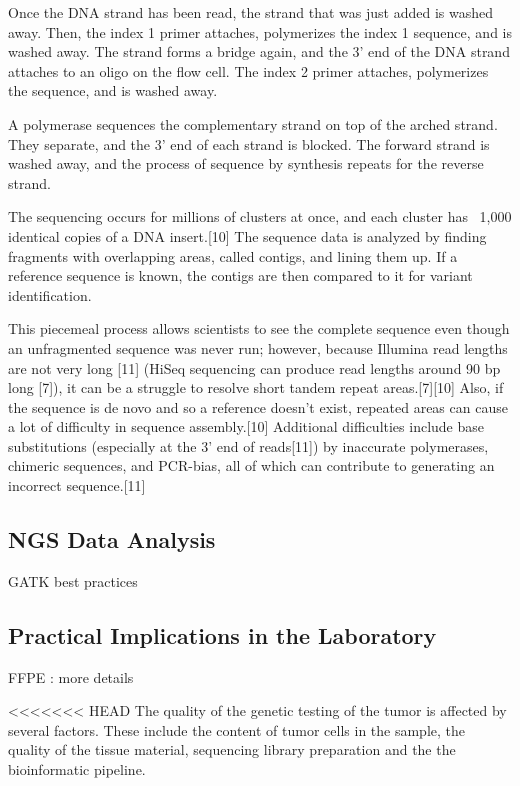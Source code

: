 Once the DNA strand has been read, the strand that was just added is washed away. Then, the index 1 primer attaches, polymerizes the index 1 sequence, and is washed away. The strand forms a bridge again, and the 3’ end of the DNA strand attaches to an oligo on the flow cell. The index 2 primer attaches, polymerizes the sequence, and is washed away.

A polymerase sequences the complementary strand on top of the arched strand. They separate, and the 3’ end of each strand is blocked. The forward strand is washed away, and the process of sequence by synthesis repeats for the reverse strand.

The sequencing occurs for millions of clusters at once, and each cluster has ~1,000 identical copies of a DNA insert.[10] The sequence data is analyzed by finding fragments with overlapping areas, called contigs, and lining them up. If a reference sequence is known, the contigs are then compared to it for variant identification.

This piecemeal process allows scientists to see the complete sequence even though an unfragmented sequence was never run; however, because Illumina read lengths are not very long [11] (HiSeq sequencing can produce read lengths around 90 bp long [7]), it can be a struggle to resolve short tandem repeat areas.[7][10] Also, if the sequence is de novo and so a reference doesn’t exist, repeated areas can cause a lot of difficulty in sequence assembly.[10] Additional difficulties include base substitutions (especially at the 3’ end of reads[11]) by inaccurate polymerases, chimeric sequences, and PCR-bias, all of which can contribute to generating an incorrect sequence.[11]



\subsection{NGS Data Analysis}

GATK best practices

\subsection{Practical Implications in the Laboratory}

FFPE : more details

<<<<<<< HEAD
The quality of the genetic testing of the tumor is affected by several factors. These include the content of tumor cells in the sample, the quality of the tissue material, sequencing library preparation and the the bioinformatic pipeline.

